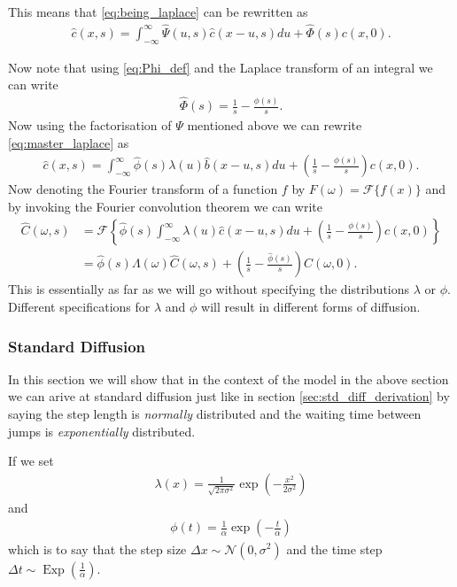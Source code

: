 This means that \eqref{eq:being_laplace} can be rewritten as
\begin{align}
    \hat{c}(x,s) = \int_{-\infty}^\infty \hat{\Psi}(u,s) \hat{c}(x-u,s)du + \hat{\Phi}(s)c(x,0).
\end{align}
 
Now note that using \eqref{eq:Phi_def} and the Laplace transform of an integral we can write
\begin{align}
    \hat{\Phi}(s) = \frac{1}{s} - \frac{\phi(s)}{s}.
\end{align}
Now using the factorisation of $ \Psi $ mentioned above we can rewrite \eqref{eq:master_laplace} as
\begin{align}
    \hat{c}(x,s) = \int_{-\infty}^\infty \hat{\phi}(s) \lambda(u)\hat{b}(x-u,s)du + \left( \frac{1}{s} - \frac{\phi(s)}{s}\right)c(x,0).
\end{align}
Now denoting the Fourier transform of a function $ f $ by $ F(\omega) = \mathcal{F}\{f(x)\} $ and by invoking the Fourier convolution theorem we can write
\begin{align}
    \hat{C}(\omega,s) &= \mathcal{F}\left\{  \hat{\phi}(s) \int_{-\infty}^\infty \lambda(u)\hat{c}(x-u,s)du + \left( \frac{1}{s} - \frac{\phi(s)}{s}\right)c(x,0) \right\} \\
    \label{eq:fourier_laplace}
    &= \hat{\phi}(s) \Lambda(\omega) \hat{C}(\omega,s) + \left( \frac{1}{s} - \frac{\hat{\phi}(s)}{s} \right)C(\omega,0).
\end{align}
This is essentially as far as we will go without specifying the distributions $ \lambda $ or $ \phi $. Different specifications for $ \lambda $ and $ \phi $ will result in different forms of diffusion. 
\subsubsection{Standard Diffusion}
In this section we will show that in the context of the model in the above section we can arive at standard diffusion just like in section \ref{sec:std_diff_derivation} by saying the step length is \emph{normally} distributed and the waiting time between jumps is \emph{exponentially} distributed.

If we set
\begin{align}
    \lambda(x) = \frac{1}{\sqrt{2\pi \sigma^2}}\exp\left(-\frac{x^2}{2\sigma^2}\right)
\end{align}
and 
\begin{align}
    \phi(t) = \frac{1}{\alpha} \exp\left(-\frac{t}{\alpha}\right)
\end{align}
which is to say that the step size $ \Delta x \sim \mathcal{N}(0,\sigma^2) $ and the time step $ \Delta t \sim \operatorname{Exp}(\frac{1}{\alpha}) $.

